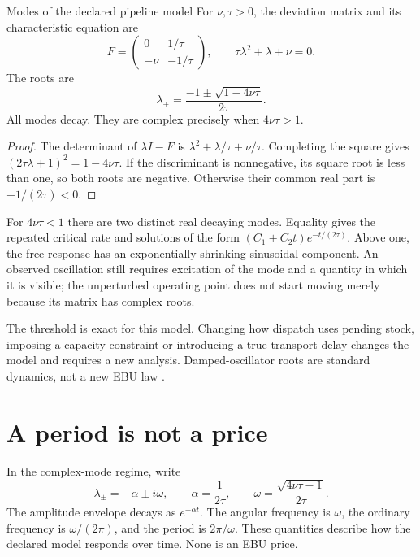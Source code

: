 \begin{theorem}{Modes of the declared pipeline model}\label{thm:tank-modes}
For $\nu,\tau>0$, the deviation matrix and its characteristic equation are
\begin{equation}
 F=\begin{pmatrix}0&1/\tau\\-\nu&-1/\tau\end{pmatrix},
 \qquad \tau\lambda^2+\lambda+\nu=0.
\end{equation}
The roots are
\begin{equation}\label{eq:tank-roots}
 \lambda_\pm=\frac{-1\pm\sqrt{1-4\nu\tau}}{2\tau}.
\end{equation}
All modes decay. They are complex precisely when $4\nu\tau>1$.
\end{theorem}
\begin{proof}
The determinant of $\lambda I-F$ is $\lambda^2+\lambda/\tau+\nu/\tau$. Completing the square gives $(2\tau\lambda+1)^2=1-4\nu\tau$. If the discriminant is nonnegative, its square root is less than one, so both roots are negative. Otherwise their common real part is $-1/(2\tau)<0$.
\end{proof}

For $4\nu\tau<1$ there are two distinct real decaying modes. Equality gives the repeated critical rate and solutions of the form $(C_1+C_2t)e^{-t/(2\tau)}$. Above one, the free response has an exponentially shrinking sinusoidal component. An observed oscillation still requires excitation of the mode and a quantity in which it is visible; the unperturbed operating point does not start moving merely because its matrix has complex roots.

The threshold is exact for this model. Changing how dispatch uses pending stock, imposing a capacity constraint or introducing a true transport delay changes the model and requires a new analysis. Damped-oscillator roots are standard dynamics, not a new EBU law \cite{feynman-transients}.

\section{A period is not a price}
In the complex-mode regime, write
\begin{equation}\label{eq:tank-frequency}
 \lambda_\pm=-\alpha\pm i\omega,
 \qquad \alpha=\frac1{2\tau},
 \qquad \omega=\frac{\sqrt{4\nu\tau-1}}{2\tau}.
\end{equation}
The amplitude envelope decays as $e^{-\alpha t}$. The angular frequency is $\omega$, the ordinary frequency is $\omega/(2\pi)$, and the period is $2\pi/\omega$. These quantities describe how the declared model responds over time. None is an EBU price.

